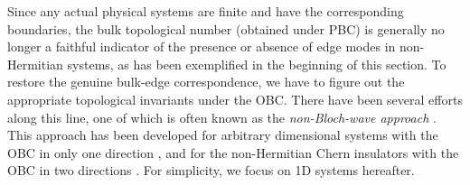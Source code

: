 \documentclass{tADP2e}
\theoremstyle{plain}
\theoremstyle{plain}
\theoremstyle{definition}
\begin{document}
\vspace{3pt}
\noindent
Since any actual physical systems are finite and have the corresponding boundaries,  
 the bulk topological number (obtained under PBC) is generally no longer a faithful indicator of the presence or absence of edge modes in non-Hermitian systems, as has been exemplified in the beginning of this section. To  restore the genuine bulk-edge correspondence, we have to figure out the appropriate topological invariants under the OBC. There have been several efforts along this line, one of which is often known as the \emph{non-Bloch-wave approach} \cite{YS18a,YS18b,KY19}. This approach has been developed  for arbitrary dimensional systems with the OBC in only one direction \cite{KY19}, and for %
the non-Hermitian Chern insulators with the OBC in two directions \cite{YS18b}. For simplicity, we %
focus on 1D systems hereafter. %
\end{document}
